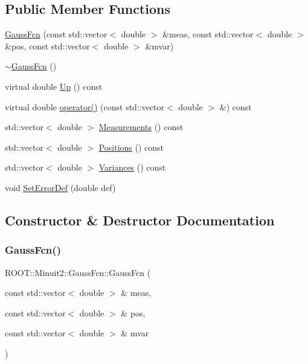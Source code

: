 \subsection*{Public Member Functions}
\begin{DoxyCompactItemize}
\item 
\mbox{\hyperlink{classROOT_1_1Minuit2_1_1GaussFcn_a2499f947aef750f0808b7954f609b368}{Gauss\+Fcn}} (const std\+::vector$<$ double $>$ \&meas, const std\+::vector$<$ double $>$ \&pos, const std\+::vector$<$ double $>$ \&mvar)
\item 
\mbox{\hyperlink{classROOT_1_1Minuit2_1_1GaussFcn_a509b50db5527c7ff908b4d6db63b38c8}{$\sim$\+Gauss\+Fcn}} ()
\item 
virtual double \mbox{\hyperlink{classROOT_1_1Minuit2_1_1GaussFcn_a7e73468f853c287df3b5da240c3b5bb5}{Up}} () const
\item 
virtual double \mbox{\hyperlink{classROOT_1_1Minuit2_1_1GaussFcn_a00140c21f302cdf076d306ac76299d1a}{operator()}} (const std\+::vector$<$ double $>$ \&) const
\item 
std\+::vector$<$ double $>$ \mbox{\hyperlink{classROOT_1_1Minuit2_1_1GaussFcn_a61ee040fbdb752b6629de59b8b512cf5}{Measurements}} () const
\item 
std\+::vector$<$ double $>$ \mbox{\hyperlink{classROOT_1_1Minuit2_1_1GaussFcn_a7098b4a70f063917479335d5f1d7473a}{Positions}} () const
\item 
std\+::vector$<$ double $>$ \mbox{\hyperlink{classROOT_1_1Minuit2_1_1GaussFcn_a477d37158239fe260003624d12e8379a}{Variances}} () const
\item 
void \mbox{\hyperlink{classROOT_1_1Minuit2_1_1GaussFcn_ad6ab65c15a43f72db27fd6ddf26486f9}{Set\+Error\+Def}} (double def)
\end{DoxyCompactItemize}


\subsection{Constructor \& Destructor Documentation}
\mbox{\label{classROOT_1_1Minuit2_1_1GaussFcn_a2499f947aef750f0808b7954f609b368}} 
\subsubsection{\texorpdfstring{GaussFcn()}{GaussFcn()}}
{\footnotesize\ttfamily R\+O\+O\+T\+::\+Minuit2\+::\+Gauss\+Fcn\+::\+Gauss\+Fcn (\begin{DoxyParamCaption}\item[{const std\+::vector$<$ double $>$ \&}]{meas,  }\item[{const std\+::vector$<$ double $>$ \&}]{pos,  }\item[{const std\+::vector$<$ double $>$ \&}]{mvar }\end{DoxyParamCaption})\hspace{0.3cm}{\ttfamily [inline]}}

